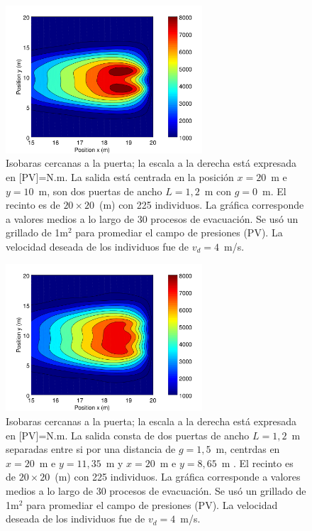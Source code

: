 \begin{figure}[H]
    \centering
    \includegraphics[height=5.5cm]{figuras/press_225p_v4_g0.png}
    \caption[width=5cm]{Isobaras cercanas a la puerta; la escala a la derecha está expresada en [PV]=N.m. La salida está centrada en la posición $x=20$~m e $y=10$~m, son dos puertas de ancho $L=1,2$~m con $g=0$~m. El recinto es de $20\times 20$~(m) con 225 individuos. La gráfica corresponde a valores medios a lo largo de 30 procesos de evacuación. Se usó un grillado de 1m$^2$ para promediar el campo de presiones (PV). La velocidad deseada de los individuos fue de $v_d=4$~m/s.}
    \label{presion_225p_g0}
\end{figure}

\begin{figure}[H]
    \centering
    \includegraphics[height=5.5cm]{figuras/press_225p_v4_g1_5.png}
    \caption[width=5cm]{Isobaras cercanas a la puerta; la escala a la derecha está expresada en [PV]=N.m. La salida consta de dos puertas de ancho $L=1,2$~m separadas entre si por una distancia de $g=1,5$~m, centrdas en $x=20$~m e $y=11,35$~m y $x=20$~m e $y=8,65$~m . El recinto es de $20\times 20$~(m) con 225 individuos. La gráfica corresponde a valores medios a lo largo de 30 procesos de evacuación. Se usó un grillado de 1m$^2$ para promediar el campo de presiones (PV). La velocidad deseada de los individuos fue de $v_d=4$~m/s.}
    \label{presion_225p_g1_5}
\end{figure}

